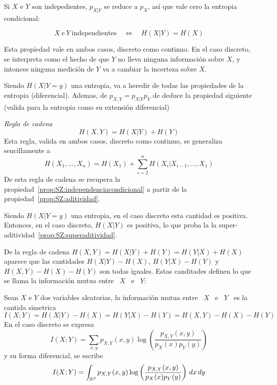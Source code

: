 Si $X$ e $Y$ son indepedientes, $p_{X|Y}$ se reduce a $p_X$, as\'i que vale cero
la entropia condicional:
%
\begin{propiedades}
\item\label{prop:SZ:independenciacondicional}
  \[
  X \: \mbox{e} \: Y \: \mbox{independientes} \quad \Leftrightarrow \quad H(X|Y)
  = H(X)
  \]
\end{propiedades}
%
Esta  propiedad  vale  en ambos  casos,  discreto  como  continuo.  En  el  caso
discreto, se interpreta como el hecho  de que $Y$ no lleva ninguna informaci\'on
sobre $X$, y intonces ninguna medici\'on  de $Y$ va a cambiar la incerteza sobre
$X$.

Siendo $H(X|Y=y)$  una entropia,  va a  heredir de todas  las propiedades  de la
entropia  (diferencial).  Ademas,  de  $p_{X,Y}  = p_{X|Y}  p_Y$  de  deduce  la
propiedad siguiente (valida para la entropia como su extensi\'on diferencial)
%
\begin{propiedades}
\item\label{prop:SZ:cadena}  {\it Regla de  cadena}
  \[
  H(X,Y) =  H(X|Y) +  H(Y)
  \]
  Esta  regla, valida  en ambos  casos,  discreto como  continuo, se  generaliza
  sencillamente a
  \[
  H(X_1 , \ldots , X_n) = H(X_1) + \sum_{i=2}^n H(X_i|X_{i-1} , \ldots , X_1)
  \]
  De       esta       regla      de       cadena       se      recupera       la
  propiedad~\ref{prop:SZ:independenciacondicional}     a     partir    de     la
  propiedad~\ref{prop:SZ:aditividad}.
\end{propiedades}
%
Siendo  $H(X|Y=y)$  una   entropia,  en  el  caso  discreto   esta  cantidad  es
positiva. Entonces, en  el caso discreto, $H(X|Y)$ es positiva,  lo que proba la
la super-aditividad~\ref{prop:SZ:superaditividad}.

De la regla de  cadena $H(X,Y) = H(X|Y) + H(Y) = H(Y|X)  + H(X)$ aparece que las
cantidades  $H(X|Y)-H(X)$, $H(Y|X)-H(Y)$  y $H(X,Y)  -  H(X) -  H(Y)$ son  todas
iguales. Estas canditades definen lo que se llama la informaci\'on mutua entre \
$X$ \ e \ $Y$:

%
\begin{definicion}\label{def:SZ:mutua}
  Sean $X$ e $Y$ dos variables  aleatorias, la informaci\'on mutua entre \ $X$ \
  e  \ $Y$ \  es la  cantida simetrica
  \[
  I(X;Y) = H(X|Y)-H(X) = H(Y|X)-H(Y) = H(X,Y) - H(X) - H(Y)
  \]
  En el caso discreto se  expresa
  \[
  I(X;Y)  =  \sum_{x,y}   p_{X,Y}(x,y)  \log  \left(  \frac{p_{X,Y}(x,y)}{p_X(x)
      p_Y(y)} \right)
  \]
  y su forma diferencial, se escribe
  \[
  I(X;Y)  = \int_{\mathbb{R}^d}  p_{X,Y}(x,y) \log  \left( \frac{p_{X,Y}(x,y)}{p_X(x)
      p_Y(y)} \right) \, dx \, dy
  \]
\end{definicion}

